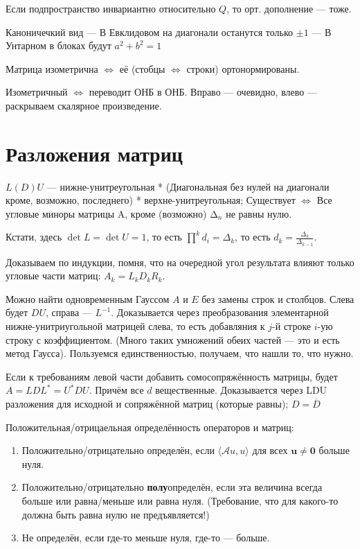 \documentclass[12pt, a4paper]{article}
\begin{document}
Если подпространство инвариантно относительно $Q$, то орт. дополнение — тоже.

Каноничечкий вид
— В Евклидовом на диагонали останутся только $± 1$
— В Унтарном в блоках будут $a^2 + b^2 = 1$

Матрица изометрична $\Longleftrightarrow$ её (стобцы $\Longleftrightarrow$ строки) ортонормированы.

Изометричный $\Longleftrightarrow$ переводит ОНБ в ОНБ.
Вправо — очевидно, влево — раскрываем скалярное произведение.


\section{Разложения матриц}

$L(D)U$ — нижне-унитреугольная * (Диагональная без нулей на диагонали кроме, возможно, последнего) * верхне-унитреугольная; 
Существует $\Longleftrightarrow$ Все угловые миноры матрицы A, кроме (возможно) $∆_n$ не равны нулю. 

Кстати, здесь $\det L = \det U = 1$, то есть $\prod^k d_i = \Delta_k$, то есть $d_k = \frac{\Delta_k}{\Delta_{k - 1}}$.

Доказываем по индукции, помня, что на очередной угол результата влияют только угловые части матриц: $A_k = L_k D_k R_k$.

Можно найти одновременным Гауссом $A$ и $E$ без замены строк и столбцов. Слева будет $DU$, справа — $L^{-1}$.
Доказывается через преобразования элементарной нижне-унитриугольной матрицей слева, то есть добавляния к $j$-й строке $i$-ую строку с коэффициентом.
(Много таких умножений обеих частей — это и есть метод Гаусса). Пользуемся единственностью, получаем, что нашли то, что нужно.

Если к требованиям левой части добавить сомосопряжённость матрицы, будет $A = LDL^* = U^*DU$. Причём все $d$ вещественные. 
Доказывается через LDU разложения для исходной и сопряжённой матриц (которые равны); $D = \overline{D}$

Положительная/отрицаельная определённость операторов и матриц: 
\begin{enumerate}
    \item Положительно/отрицательно определён, если $\langle \mathcal{A} u, u \rangle$ для всех $\mathbf{u \neq 0}$ больше нуля.
    \item Положительно/отрицательно \textbf{полу}определён, если эта величина всегда больше или равна/меньше или равна нуля.
    (Требование, что для какого-то должна быть равна нулю не предъявляется!)
    \item Не определён, если где-то меньше нуля, где-то — больше.
\end{enumerate}
\end{document}
